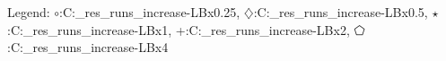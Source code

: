 Legend: {\color{CornflowerBlue}$\circ$}:C:\Users\tristan\Documents\ppsn\BBOB\raw\_res\remaining\_runs\sigmalb\_increase\exdata\IC-LBx0.25, {\color{Orange}$\diamondsuit$}:C:\Users\tristan\Documents\ppsn\BBOB\raw\_res\remaining\_runs\sigmalb\_increase\exdata\IC-LBx0.5, {\color{Green}$\star$}:C:\Users\tristan\Documents\ppsn\BBOB\raw\_res\remaining\_runs\sigmalb\_increase\exdata\IC-LBx1, {\color{red}+}:C:\Users\tristan\Documents\ppsn\BBOB\raw\_res\remaining\_runs\sigmalb\_increase\exdata\IC-LBx2, {\color{magenta}$\pentagon$}:C:\Users\tristan\Documents\ppsn\BBOB\raw\_res\remaining\_runs\sigmalb\_increase\exdata\IC-LBx4